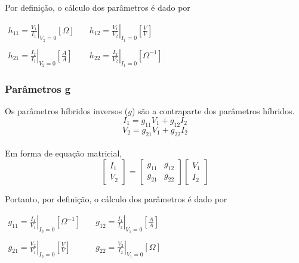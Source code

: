 \documentclass{article}
\numberwithin{equation}{section}
\begin{document}
\noindent Por definição, o cálculo dos parâmetros é dado por
\begin{center}
    $\begin{matrix} %
            h_{11}=\displaystyle\left.\frac{V_{1}}{I_{1}}\right|_{V_{2}=0} [\Omega] &\quad h_{12}=\displaystyle\left.\frac{V_{1}}{V_{2}}\right|_{I_{1}=0}\left[\frac{V}{V}\right]\\\\
            h_{21}=\displaystyle\left.\frac{I_{2}}{I_{1}}\right|_{V_{2}=0}\left[\frac{A}{A}\right]&\quad
            h_{22}=\displaystyle\left.\frac{I_{2}}{V_{2}}\right|_{I_{1}=0} [\Omega^{-1}]
    \end{matrix}$
\end{center}
\subsubsection{Parâmetros g}
Os parâmetros híbridos inversos ($g$) são a contraparte dos parâmetros híbridos.
\begin{equation*}
    I_{1}=g_{11}V_{1}+g_{12}I_{2}
\end{equation*}
\begin{equation*}
    V_{2}=g_{21}V_{1}+g_{22}I_{2}
\end{equation*}\\
Em forma de equação matricial,
\begin{equation}
    \begin{bmatrix}
        I_{1} \\
        V_{2}
    \end{bmatrix}
    = %
    \begin{bmatrix}
        g_{11} & g_{12} \\
        g_{21} & g_{22}
    \end{bmatrix}
    \begin{bmatrix}
        V_{1} \\
        I_{2}
    \end{bmatrix}
\end{equation}

Portanto, por definição, o cálculo dos parâmetros é dado por
\begin{center}
    $\begin{matrix} %
            g_{11}=\displaystyle\left.\frac{I_{1}}{V_{1}}\right|_{I_{2}=0} [\Omega^{-1}] &\quad g_{12}=\displaystyle\left.\frac{I_{1}}{I_{2}}\right|_{V_{1}=0}\left[\frac{A}{A}\right]\\\\
            g_{21}=\displaystyle\left.\frac{V_{2}}{V_{1}}\right|_{I_{2}=0}\left[\frac{V}{V}\right]&\quad
            g_{22}=\displaystyle\left.\frac{V_{2}}{I_{2}}\right|_{V_{1}=0} [\Omega]
    \end{matrix}$
\end{center}
\end{document}
